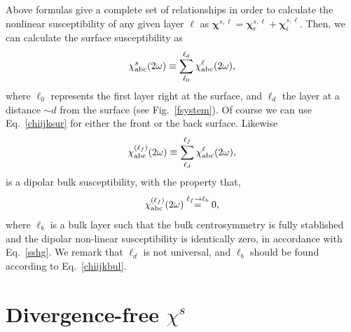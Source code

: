 \documentclass{article}
\begin{document}
Above formulas give a complete set of relationships in order to calculate
the nonlinear susceptibility of any given layer $\ell$ as
$\boldsymbol{\chi}^{s,\ell}=\boldsymbol{\chi}_e^{s,\ell}+\boldsymbol{\chi}_i^{s,\ell}$. 
Then,
we can calculate the surface
susceptibility as 
\begin{equation}\label{chiijksur}
\chi_{\mathrm{a}\mathrm{b}\mathrm{c}}^s(2\omega)\equiv \sum_{\ell_0}^{\ell_d}\chi_{\mathrm{a}\mathrm{b}\mathrm{c}}^{\ell}(2\omega),
\end{equation}
where $\ell_0$ represents the first  layer right at the surface, and $\ell_d$ the
layer at a distance $\sim d$ from the surface (see
Fig.~\ref{fsystem}). Of course we can use Eq.~\eqref{chiijksur} for
either the front or the back surface.
Likewise
\begin{equation}\label{chiijklf}
\chi_{\mathrm{a}\mathrm{b}\mathrm{c}}^{(\ell_f)}(2\omega)\equiv \sum_{\ell_d}^{\ell_f}\chi_{\mathrm{a}\mathrm{b}\mathrm{c}}^{\ell}(2\omega),
\end{equation}
is a dipolar bulk susceptibility, with the property that,
\begin{equation}\label{chiijkbul}
\chi_{\mathrm{a}\mathrm{b}\mathrm{c}}^{(\ell_f)}(2\omega)\stackrel{\ell_f \to \ell_b}{=} 0,
\end{equation}
where $\ell_b$ is a bulk layer such that the bulk centrosymmetry is
fully stablished and the dipolar non-linear susceptibility is
identically zero, in accordance with Eq.~\eqref{sshg}. We remark that 
$\ell_d$  is
not universal, and $\ell_b$ should be found according to Eq.~\eqref{chiijkbul}. 

\section{Divergence-free $\chi^s$}
\end{document}
